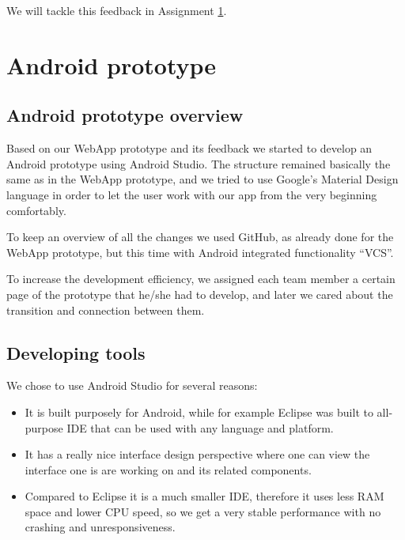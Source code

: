 \documentclass[11pt,twoside,a4paper]{report}
\begin{document}
We will tackle this feedback in Assignment \ref{assignment:android-prototype}.

\chapter{Android prototype}
\label{assignment:android-prototype}

\section{Android prototype overview}

Based on our WebApp prototype and its feedback we started to develop an Android prototype using Android Studio. The structure remained basically the same as in the WebApp prototype, and we tried to use Google's Material Design language in order to let the user work with our app from the very beginning comfortably.

To keep an overview of all the changes we used GitHub, as already done for the WebApp prototype, but this time with Android integrated functionality ``VCS''.

To increase the development efficiency, we assigned each team member a certain page of the prototype that he/she had to develop, and later we cared about the transition and connection between them.

\section{Developing tools}

We chose to use Android Studio for several reasons:

\begin{itemize}

\item It is built purposely for Android, while for example Eclipse was built to all-purpose IDE that can be used with any language and platform.

\item It has a really nice interface design perspective where one can view the interface one is are working on and its related components.

\item Compared to Eclipse it is a much smaller IDE, therefore it uses less RAM space and lower CPU speed, so we get a very stable performance with no crashing and unresponsiveness.

\end{itemize}
\end{document}
